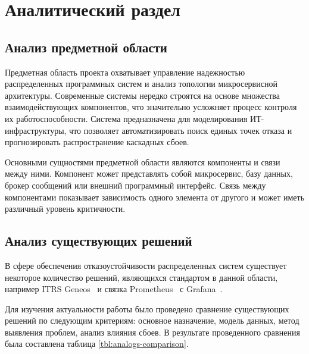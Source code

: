 \section{Аналитический раздел}

\subsection{Анализ предметной области}
Предметная область проекта охватывает управление надежностью распределенных
программных систем и анализ топологии микросервисной архитектуры. Современные
системы нередко строятся на основе множества взаимодействующих компонентов, что
значительно усложняет процесс контроля их работоспособности. Система
предназначена для моделирования ИТ-инфраструктуры, что позволяет
автоматизировать поиск единых точек отказа и прогнозировать распространение
каскадных сбоев.

Основными сущностями предметной области являются компоненты и связи между ними.
Компонент может представлять собой микросервис, базу данных, брокер сообщений
или внешний программный интерфейс. Связь между компонентами показывает
зависимость одного элемента от другого и может иметь различный уровень критичности.

\subsection{Анализ существующих решений}
В сфере обеспечения отказоустойчивости распределенных систем существует
некоторое количество решений, являющихся стандартом в данной области, например
ITRS Geneos~\cite{ref:geneos} и связка Prometheus~\cite{ref:prometheus} с
Grafana~\cite{ref:grafana}.

Для изучения актуальности работы было проведено сравнение существующих решений
по следующим критериям: основное назначение, модель данных, метод выявления
проблем, анализ влияния сбоев. В результате проведенного сравнения была
составлена таблица \ref{tbl:analogs-comparison}.

